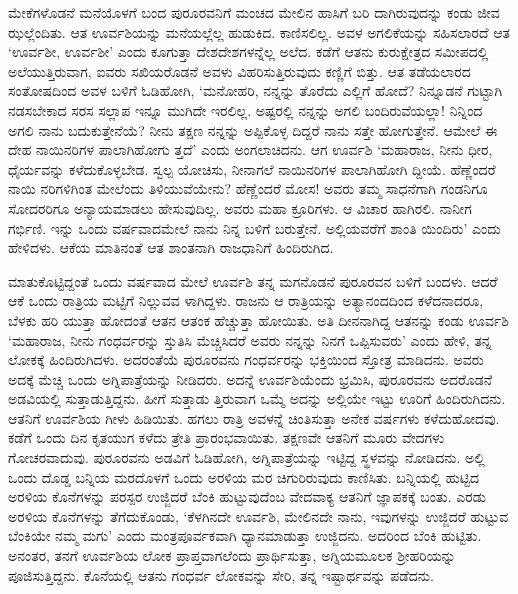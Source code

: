 ಮೇಕೆಗಳೊಡನೆ ಮನೆಯೊಳಗೆ ಬಂದ ಪುರೂರವನಿಗೆ ಮಂಚದ ಮೇಲಿನ ಹಾಸಿಗೆ ಬರಿ ದಾಗಿರುವುದನ್ನು ಕಂಡು ಜೀವ ಝಲ್ಲೆಂದಿತು. ಆತ ಊರ್ವಶಿಯನ್ನು ಮನೆಯಲ್ಲೆಲ್ಲ ಹುಡುಕಿದ. ಕಾಣಿಸಲಿಲ್ಲ. ಅವಳ ಅಗಲಿಕೆಯನ್ನು ಸಹಿಸಲಾರದೆ ಆತ ‘ಊರ್ವಶೀ, ಊರ್ವಶೀ’ ಎಂದು ಕೂಗುತ್ತಾ ದೇಶದೇಶಗಳನ್ನೆಲ್ಲ ಅಲೆದ. ಕಡೆಗೆ ಆತನು ಕುರುಕ್ಷೇತ್ರದ ಸಮೀಪದಲ್ಲಿ ಅಲೆಯುತ್ತಿರುವಾಗ, ಐವರು ಸಖಿಯರೊಡನೆ ಅವಳು ವಿಹರಿಸುತ್ತಿರುವುದು ಕಣ್ಣಿಗೆ ಬಿತ್ತು. ಆತ ತಡೆಯಲಾರದ ಸಂತೋಷದಿಂದ ಅವಳ ಬಳಿಗೆ ಓಡಿಹೋಗಿ, ‘ಮನೋಹರಿ, ನನ್ನನ್ನು ತೊರೆದು ಎಲ್ಲಿಗೆ ಹೋದೆ? ನಿನ್ನೂಡನೆ ಗುಟ್ಟಾಗಿ ನಡಸಬೇಕಾದ ಸರಸ ಸಲ್ಲಾಪ ಇನ್ನೂ ಮುಗಿದೇ ಇರಲಿಲ್ಲ. ಅಷ್ಟರಲ್ಲಿ ನನ್ನನ್ನು ಅಗಲಿ ಬಂದಿರುವೆಯಲ್ಲಾ! ನಿನ್ನಿಂದ ಅಗಲಿ ನಾನು ಬದುಕುತ್ತೇನೆಯೆ? ನೀನು ತಕ್ಷಣ ನನ್ನನ್ನು ಅಪ್ಪಿಕೊಳ್ಳ ದಿದ್ದರೆ ನಾನು ಸತ್ತೇ ಹೋಗುತ್ತೇನೆ. ಆಮೇಲೆ ಈ ದೇಹ ನಾಯಿನರಿಗಳ ಪಾಲಾಗಿಹೋಗು ತ್ತದೆ’ ಎಂದು ಅಂಗಲಾಚಿದನು. ಆಗ ಊರ್ವಶಿ ‘ಮಹಾರಾಜ, ನೀನು ಧೀರ, ಧೈರ್ಯವನ್ನು ಕಳೆದುಕೊಳ್ಳಬೇಡ. ಸ್ವಲ್ಪ ಯೋಚಿಸು, ನೀನಾಗಲೆ ನಾಯಿನರಿಗಳ ಪಾಲಾಗಿಹೋಗಿ ದ್ದೀಯೆ. ಹೆಣ್ಣೆಂದರೆ ನಾಯಿ ನರಿಗಳಿಗಿಂತ ಮೇಲೆಂದು ತಿಳಿಯುವೆಯೇನು? ಹೆಣ್ಣೆಂದರೆ ಮೋಸ! ಅವರು ತಮ್ಮ ಸಾಧನೆಗಾಗಿ ಗಂಡನಿಗೂ ಸೋದರರಿಗೂ ಅನ್ಯಾಯಮಾಡಲು ಹೇಸುವುದಿಲ್ಲ. ಅವರು ಮಹಾ ಕ್ರೂರಿಗಳು. ಆ ವಿಚಾರ ಹಾಗಿರಲಿ. ನಾನೀಗ ಗರ್ಭಿಣಿ. ಇನ್ನು ಒಂದು ವರ್ಷವಾದಮೇಲೆ ನಾನು ನಿನ್ನ ಬಳಿಗೆ ಬರುತ್ತೇನೆ. ಅಲ್ಲಿಯವರೆಗೆ ಶಾಂತಿ ಯಿಂದಿರು’ ಎಂದು ಹೇಳಿದಳು. ಆಕೆಯ ಮಾತಿನಂತೆ ಆತ ಶಾಂತನಾಗಿ ರಾಜಧಾನಿಗೆ ಹಿಂದಿರುಗಿದ.

ಮಾತುಕೊಟ್ಟಿದ್ದಂತೆ ಒಂದು ವರ್ಷವಾದ ಮೇಲೆ ಊರ್ವಶಿ ತನ್ನ ಮಗನೊಡನೆ ಪುರೂರವನ ಬಳಿಗೆ ಬಂದಳು. ಆದರೆ ಆಕೆ ಒಂದು ರಾತ್ರಿಯ ಮಟ್ಟಿಗೆ ನಿಲ್ಲುವವ ಳಾಗಿದ್ದಳು. ರಾಜನು ಆ ರಾತ್ರಿಯನ್ನು ಅತ್ಯಾನಂದದಿಂದ ಕಳೆದನಾದರೂ, ಬೆಳಕು ಹರಿ ಯುತ್ತಾ ಹೋದಂತೆ ಆತನ ಆತಂಕ ಹೆಚ್ಚುತ್ತಾ ಹೋಯಿತು. ಅತಿ ದೀನನಾಗಿದ್ದ ಆತನನ್ನು ಕಂಡು ಊರ್ವಶಿ ‘ಮಹಾರಾಜ, ನೀನು ಗಂಧರ್ವರನ್ನು ಸ್ತುತಿಸಿ ಮೆಚ್ಚಿಸಿದರೆ ಅವರು ನನ್ನನ್ನು ನಿನಗೆ ಒಪ್ಪಿಸುವರು’ ಎಂದು ಹೇಳಿ, ತನ್ನ ಲೋಕಕ್ಕೆ ಹಿಂದಿರುಗಿದಳು. ಅದರಂತೆಯೆ ಪುರೂರವನು ಗಂಧರ್ವರನ್ನು ಭಕ್ತಿಯಿಂದ ಸ್ತೋತ್ರ ಮಾಡಿದನು. ಅವರು ಅದಕ್ಕೆ ಮೆಚ್ಚಿ ಒಂದು ಅಗ್ನಿಪಾತ್ರೆಯನ್ನು ನೀಡಿದರು. ಅದನ್ನೆ ಊರ್ವಶಿಯೆಂದು ಭ್ರಮಿಸಿ, ಪುರೂರವನು ಅದರೊಡನೆ ಅಡವಿಯಲ್ಲಿ ಸುತ್ತಾಡುತ್ತಿದ್ದನು. ಹೀಗೆ ಸುತ್ತಾಡು ತ್ತಿರುವಾಗ ಒಮ್ಮೆ ಅದನ್ನು ಅಲ್ಲಿಯೇ ಇಟ್ಟು ಊರಿಗೆ ಹಿಂದಿರುಗಿದನು. ಆತನಿಗೆ ಊರ್ವಶಿಯ ಗೀಳು ಹಿಡಿಯಿತು. ಹಗಲು ರಾತ್ರಿ ಅವಳನ್ನೆ ಚಿಂತಿಸುತ್ತಾ ಅನೇಕ ವರ್ಷಗಳು ಕಳೆದುಹೋದವು. ಕಡೆಗೆ ಒಂದು ದಿನ ಕೃತಯುಗ ಕಳೆದು ತ್ರೇತಿ ಪ್ರಾರಂಭವಾಯಿತು. ತಕ್ಷಣವೇ ಆತನಿಗೆ ಮೂರು ವೇದಗಳು ಗೋಚರವಾದುವು. ಪುರೂರವನು ಅಡವಿಗೆ ಓಡಿಹೋಗಿ, ಅಗ್ನಿಪಾತ್ರೆಯನ್ನು ಇಟ್ಟಿದ್ದ ಸ್ಥಳವನ್ನು ನೋಡಿದನು. ಅಲ್ಲಿ ಒಂದು ದೊಡ್ಡ ಬನ್ನಿಯ ಮರದೊಳಗೆ ಒಂದು ಅರಳಿಯ ಮರ ಚಿಗುರಿರುವುದು ಕಾಣಿಸಿತು. ಬನ್ನಿಯಲ್ಲಿ ಹುಟ್ಟಿದ ಅರಳಿಯ ಕೊನೆಗಳನ್ನು ಪರಸ್ಪರ ಉಜ್ಜಿದರೆ ಬೆಂಕಿ ಹುಟ್ಟುವುದೆಂಬ ವೇದವಾಕ್ಯ ಆತನಿಗೆ ಜ್ಞಾಪಕಕ್ಕೆ ಬಂತು. ಎರಡು ಅರಳಿಯ ಕೊನೆಗಳನ್ನು ತೆಗೆದುಕೊಂಡು, ‘ಕೆಳಗಿನದೇ ಊರ್ವಶಿ, ಮೇಲಿನದೇ ನಾನು, ಇವುಗಳನ್ನು ಉಜ್ಜಿದರೆ ಹುಟ್ಟುವ ಬೆಂಕಿಯೇ ನಮ್ಮ ಮಗು’ ಎಂದು ಮಂತ್ರಪೂರ್ವಕವಾಗಿ ಧ್ಯಾನಮಾಡುತ್ತಾ ಉಜ್ಜಿದನು. ಅದರಿಂದ ಬೆಂಕಿ ಹುಟ್ಟಿತು. ಅನಂತರ, ತನಗೆ ಊರ್ವಶಿಯ ಲೋಕ ಪ್ರಾಪ್ತವಾಗಲೆಂದು ಪ್ರಾರ್ಥಿಸುತ್ತಾ, ಅಗ್ನಿಯಮೂಲಕ ಶ್ರೀಹರಿಯನ್ನು ಪೂಜಿಸುತ್ತಿದ್ದನು. ಕೊನೆಯಲ್ಲಿ ಆತನು ಗಂಧರ್ವ ಲೋಕವನ್ನು ಸೇರಿ, ತನ್ನ ಇಷ್ಟಾರ್ಥವನ್ನು ಪಡೆದನು.

